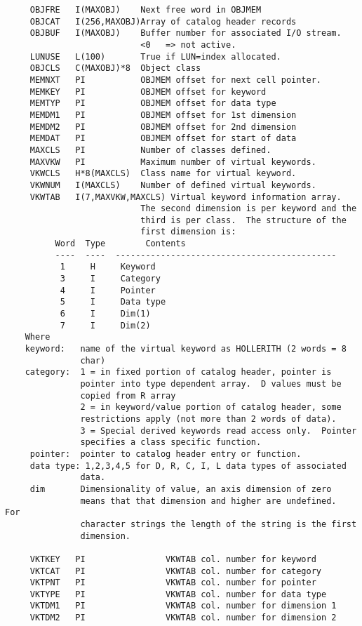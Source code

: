 {\begin{verbatim}
     OBJFRE   I(MAXOBJ)    Next free word in OBJMEM
     OBJCAT   I(256,MAXOBJ)Array of catalog header records
     OBJBUF   I(MAXOBJ)    Buffer number for associated I/O stream.
                           <0   => not active.
     LUNUSE   L(100)       True if LUN=index allocated.
     OBJCLS   C(MAXOBJ)*8  Object class
     MEMNXT   PI           OBJMEM offset for next cell pointer.
     MEMKEY   PI           OBJMEM offset for keyword
     MEMTYP   PI           OBJMEM offset for data type
     MEMDM1   PI           OBJMEM offset for 1st dimension
     MEMDM2   PI           OBJMEM offset for 2nd dimension
     MEMDAT   PI           OBJMEM offset for start of data
     MAXCLS   PI           Number of classes defined.
     MAXVKW   PI           Maximum number of virtual keywords.
     VKWCLS   H*8(MAXCLS)  Class name for virtual keyword.
     VKWNUM   I(MAXCLS)    Number of defined virtual keywords.
     VKWTAB   I(7,MAXVKW,MAXCLS) Virtual keyword information array.
                           The second dimension is per keyword and the
                           third is per class.  The structure of the
                           first dimension is:
          Word  Type        Contents
          ----  ----  --------------------------------------------
           1     H     Keyword
           3     I     Category
           4     I     Pointer
           5     I     Data type
           6     I     Dim(1)
           7     I     Dim(2)
    Where
    keyword:   name of the virtual keyword as HOLLERITH (2 words = 8
               char)
    category:  1 = in fixed portion of catalog header, pointer is
               pointer into type dependent array.  D values must be
               copied from R array
               2 = in keyword/value portion of catalog header, some
               restrictions apply (not more than 2 words of data).
               3 = Special derived keywords read access only.  Pointer
               specifies a class specific function.
     pointer:  pointer to catalog header entry or function.
     data type: 1,2,3,4,5 for D, R, C, I, L data types of associated
               data.
     dim       Dimensionality of value, an axis dimension of zero
               means that that dimension and higher are undefined.  For
               character strings the length of the string is the first
               dimension.

     VKTKEY   PI                VKWTAB col. number for keyword
     VKTCAT   PI                VKWTAB col. number for category
     VKTPNT   PI                VKWTAB col. number for pointer
     VKTYPE   PI                VKWTAB col. number for data type
     VKTDM1   PI                VKWTAB col. number for dimension 1
     VKTDM2   PI                VKWTAB col. number for dimension 2


\end{verbatim}}
